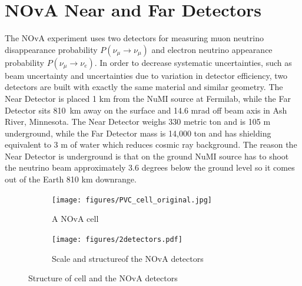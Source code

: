 \section{NOvA Near and Far Detectors}
The NOvA experiment uses two detectors for measuring muon neutrino disappearance probability 
$P(\nu_\mu \rightarrow \nu_\mu)$ and electron neutrino appearance probability $P(\nu_\mu \rightarrow \nu_e)$. 
In order to decrease systematic uncertainties, such as beam uncertainty and uncertainties due to variation
in detector efficiency, two detectors are built with exactly the same material and 
similar geometry. The Near Detector is placed 1 km from the NuMI source at Fermilab, while the 
Far Detector sits 810~km away on the surface and 14.6 mrad off beam axis in Ash River, Minnesota. 
The Near Detector weighs 330 metric ton and is 105 m underground, while the Far Detector mass is 
14,000 ton and has shielding equivalent to 3 m of water which reduces cosmic ray background.
The reason the Near Detector is underground is that on the ground NuMI source has to shoot the neutrino beam 
approximately 3.6 degrees below the ground level so it comes out of the Earth 810 km downrange. 
\begin{figure}
\begin{subfigure}{.2\textwidth}
  \centering
  \texttt{[image: figures/PVC\_cell\_original.jpg]}
  \caption{A NOvA cell}
  \label{fig:cell}
\end{subfigure}%
\begin{subfigure}{.8\textwidth}
  \centering
  \texttt{[image: figures/2detectors.pdf]}
  \caption{Scale and structureof the NOvA detectors}
  \label{fig:2detectors}
\end{subfigure}
\caption{Structure of cell and the NOvA detectors}
\label{fig:cell_detectors}
\end{figure}

